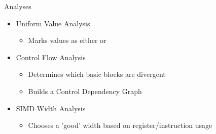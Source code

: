 
\begin{frame}{Analyses}

\begin{itemize}
    \item Uniform Value Analysis
    \begin{itemize}
        \item Marks values as either  or 
    \end{itemize}

    \item Control Flow Analysis
    \begin{itemize}
        \item Determines which basic blocks are divergent
        \item Builds a Control Dependency Graph
    \end{itemize}
    
    \item SIMD Width Analysis
    \begin{itemize}
        \item Chooses a 'good' width based on register/instruction usage
    \end{itemize}
\end{itemize}

\end{frame}


%
%
%    
%

